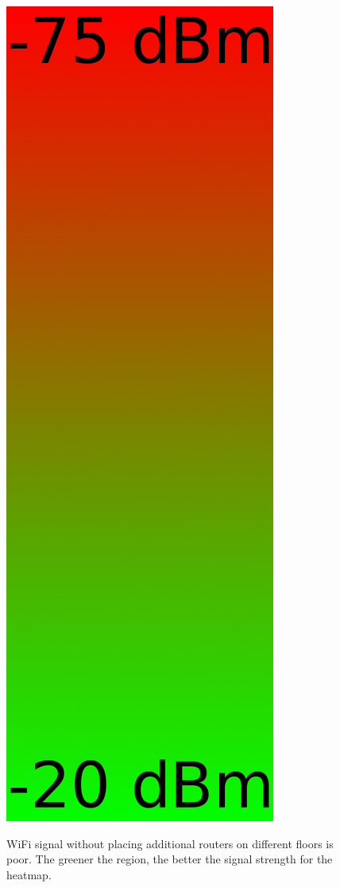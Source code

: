 \documentclass[10pt]{sensys-proc}
\newcommand{\redcolor}[1]{\textcolor{red}{#1}}
\begin{document}
\begin{figure}[t!]
{                         \includegraphics[scale=0.0275]{./figures/heatmap.png}}
              \vspace{-3mm}
    \caption{WiFi signal without placing additional routers on different floors is poor. The greener the region, the better the signal strength for the heatmap. 
}
\end{figure}
\end{document}
